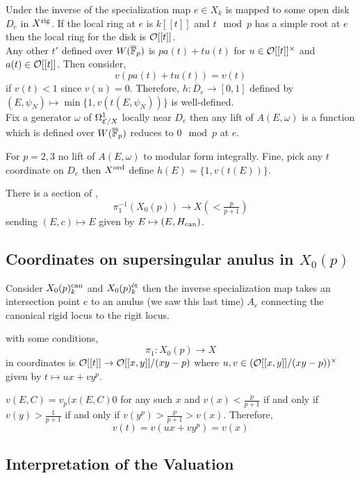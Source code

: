\documentclass[12pt]{article}
\begin{document}
Under the inverse of the specialization map $e \in X_k$ is mapped to some open disk $D_e$ in $X^{\mathrm{rig}}$. If the local ring at $e$ is $k[[t]]$ and $t \mod p$ has a simple root at $e$ then the local ring for the disk is $\mathcal{O}[[t]]$. 
\bigskip\\
Any other $t'$ defined over $W(\overline{\mathbb{F}}_p)$ is $p a(t) + t u(t)$ for $u \in \mathcal{O}[[t]]^\times$ and $a(t) \in \mathcal{O}[[t]]$. Then consider,
\[ v(p a(t) + t u(t)) = v(t) \]
if $v(t) < 1$ since $v(u) = 0$. Therefore, $h : \overline{D}_e \to [0, 1]$ defined by $(E, \psi_N) \mapsto \min \{1 , v(t(E, \psi_N)) \}$ is well-defined. 
\bigskip\\
Fix a generator $\omega$ of $\Omega^1_{\mathcal{E} / X}$ locally near $D_e$ then any lift of $A(E, \omega)$ is a function which is defined over $W(\overline{\mathbb{F}}_p)$ reduces to $0 \mod p$ at $e$. 

\begin{rmk}
For $p = 2,3$ no lift of $A(E, \omega)$ to modular form integrally. Fine, pick any $t$ coordinate on $D_e$ then $X^{\operatorname{\mathrm{ord}}}$ define $h(E) = \{ 1, v(t(E)) \}$. 
\end{rmk}

There is a section of ,
\[ \pi_1^{-1}(X_0(p)) \to X(< \tfrac{p}{p+1}) \]
sending $(E, c) \mapsto E$ given by $E \mapsto (E, H_{\mathrm{can}})$. 

\subsection{Coordinates on supersingular anulus in $X_0(p)$}

Consider $X_0(p)^{\mathrm{can}}_k$ and $X_0(p)^{\text{\'{e}t}}_k$ then the inverse specialization map takes an intersection point $e$ to an anulus (we saw this last time) $A_e$ connecting the canonical rigid locus to the \etale rigit locus. 

\begin{lemma}
with some conditions,
\[ \pi_1 : X_0(p) \to X \]
in coordinates is $\mathcal{O}[[t]] \to \mathcal{O}[[x,y]] / (xy - p)$ where $u,v \in (\mathcal{O}[[x,y]] / (xy - p))^\times$ given by $t \mapsto u x + v y^p$. 
\end{lemma}

\begin{defn}
$v(E, C) = v_p(x(E, C)0$ for any such $x$ and $v(x) < \frac{p}{p+1}$ if and only if $v(y) > \frac{1}{p+1}$ if and only if $v(y^p) > \frac{p}{p+1} > v(x)$. Therefore,
\[ v(t) = v(ux + v y^p) = v(x) \]
\end{defn}

\subsection{Interpretation of the Valuation}
\end{document}
